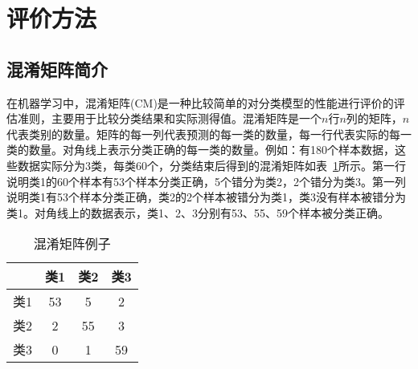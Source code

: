 \section{评价方法}

\subsection{混淆矩阵简介}
\label{CM}

在机器学习中，混淆矩阵(CM)是一种比较简单的对分类模型的性能进行评价的评估准则，主要用于比较分类结果和实际测得值。混淆矩阵是一个$n$行$n$列的矩阵，$n$代表类别的数量。矩阵的每一列代表预测的每一类的数量，每一行代表实际的每一类的数量。对角线上表示分类正确的每一类的数量。例如：有180个样本数据，这些数据实际分为3类，每类60个，分类结束后得到的混淆矩阵如表~\ref{ConfusionMatrixExample}所示。第一行说明类1的60个样本有53个样本分类正确，5个错分为类2，2个错分为类3。第一列说明类1有53个样本分类正确，类2的2个样本被错分为类1，类3没有样本被错分为类1。对角线上的数据表示，类1、2、3分别有53、55、59个样本被分类正确。
    
\begin{table}[ht]
\centering
\caption{混淆矩阵例子}
\begin{tabular}[c]{|c|c|c|c|}
\hline
 & 类1 & 类2 & 类3\\
 \hline
类1 & 53 & 5 & 2 \\
\hline
类2 & 2 & 55 & 3\\ 
\hline
类3 & 0 & 1 & 59\\ 
\hline
\end{tabular}
\label{ConfusionMatrixExample}
\end{table}

